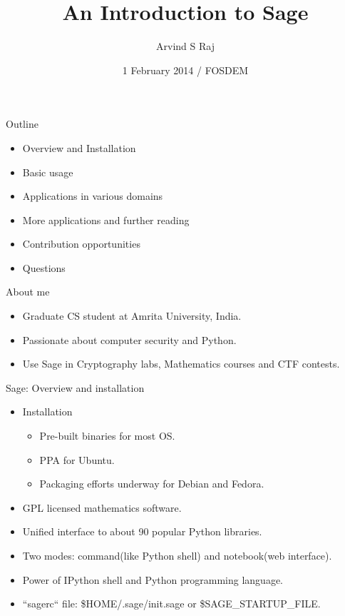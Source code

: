 \documentclass{beamer}
\title{An Introduction to Sage}
\author[Arvind]
{Arvind S Raj}
\institute[Amrita]
{
  Department of Cybersecurity Systems and Networks\\
  Amrita University, India
}
\date[FOSDEM 2014]
{1 February 2014 / FOSDEM}
\begin{document}
\begin{frame}
  \titlepage
\end{frame}

\begin{frame}{Outline}
  \begin{itemize}
   \item Overview and Installation
   \item Basic usage
   \item Applications in various domains
   \item More applications and further reading
   \item Contribution opportunities
   \item Questions
  \end{itemize}
\end{frame}

\begin{frame}{About me}
  \begin{itemize}
    \item Graduate CS student at Amrita University, India.
    \item Passionate about computer security and Python.
    \item Use Sage in Cryptography labs, Mathematics courses and CTF contests.
  \end{itemize}
\end{frame}

\begin{frame}{Sage: Overview and installation}
  \begin{itemize}
   \item Installation
    \begin{itemize}
     \item Pre-built binaries for most OS.
     \item PPA for Ubuntu.
     \item Packaging efforts underway for Debian and Fedora.
    \end{itemize}
   \item GPL licensed mathematics software.
   \item Unified interface to about 90 popular Python libraries.
   \item Two modes: command(like Python shell) and notebook(web interface).
   \item Power of IPython shell and Python programming language.
   \item ``sagerc`` file: \$HOME/.sage/init.sage or \$SAGE\_STARTUP\_FILE.
  \end{itemize}
\end{frame}
\end{document}
